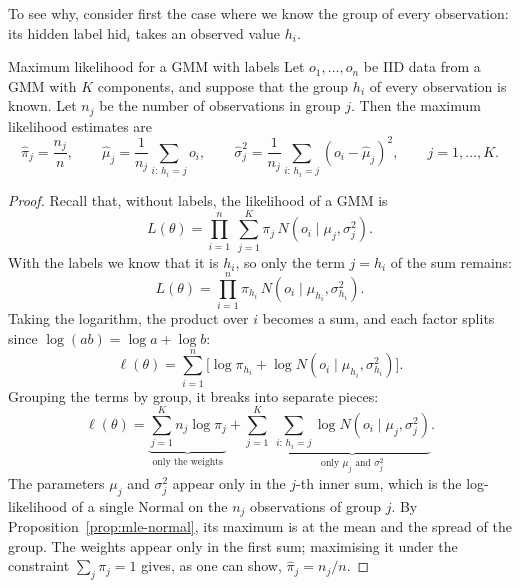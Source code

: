 \documentclass[a4paper,12pt,oneside]{report}
\begin{document}
To see why, consider first the case where we know the group of every
observation: its hidden label $\text{hid}_i$ takes an observed value $h_i$.

\begin{framedprop}{Maximum likelihood for a GMM with labels}\label{prop:mle-gmm-labels}
Let $o_1,\ldots,o_n$ be IID data from a GMM with $K$ components, and suppose
that the group $h_i$ of every observation is known. Let $n_j$ be the number
of observations in group $j$. Then the maximum likelihood estimates are
\[
\hat\pi_j=\frac{n_j}{n},\qquad
\hat\mu_j=\frac{1}{n_j}\sum_{i:\,h_i=j}o_i,\qquad
\hat\sigma_j^2=\frac{1}{n_j}\sum_{i:\,h_i=j}(o_i-\hat\mu_j)^2,
\qquad j=1,\ldots,K.
\]
\end{framedprop}

\begin{proof}
Recall that, without labels, the likelihood of a GMM is
\[
L(\theta)=\prod_{i=1}^n\ \sum_{j=1}^K\pi_j\,N(o_i\mid\mu_j,\sigma_j^2).
\]
With the labels we know that it is $h_i$, so only the term
$j=h_i$ of the sum remains:
\[
L(\theta)=\prod_{i=1}^n\pi_{h_i}\,N(o_i\mid\mu_{h_i},\sigma_{h_i}^2).
\]
Taking the logarithm, the product over $i$ becomes a sum, and each factor
splits since $\log(ab)=\log a+\log b$:
\[
\ell(\theta)=\sum_{i=1}^n\Big[\log\pi_{h_i}+\log N(o_i\mid\mu_{h_i},\sigma_{h_i}^2)\Big].
\]
Grouping the terms by group, it breaks into separate pieces:
\[
\ell(\theta)=\underbrace{\sum_{j=1}^K n_j\log\pi_j}_{\text{only the weights}}
+\sum_{j=1}^K\ \underbrace{\sum_{i:\,h_i=j}\log N(o_i\mid\mu_j,\sigma_j^2)}_{\text{only }\mu_j\text{ and }\sigma_j^2}.
\]
The parameters $\mu_j$ and $\sigma_j^2$ appear only in the $j$-th inner sum,
which is the log-likelihood of a single Normal on the $n_j$ observations of
group $j$. By Proposition~\ref{prop:mle-normal}, its maximum is at the mean
and the spread of the group. The weights appear only in the first sum;
maximising it under the constraint $\sum_j\pi_j=1$ gives, as one can show,
$\hat\pi_j=n_j/n$.
\end{proof}
\end{document}
